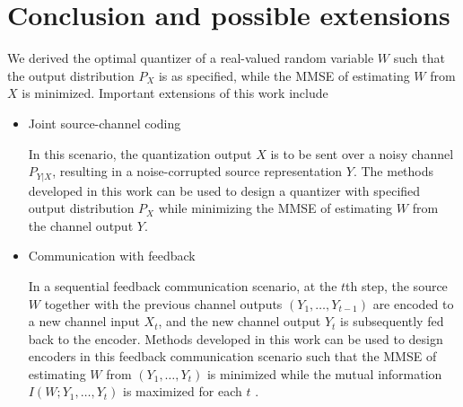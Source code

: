 \documentclass[conference]{IEEEtran}
\newcommand{\E}{\mathbb{E}}
\begin{document}
\section{Conclusion and possible extensions}
We derived the optimal quantizer of a real-valued random variable $W$ such that the output distribution $P_X$ is as specified, while the MMSE of estimating $W$ from $X$ is minimized.
Important extensions of this work include 
\begin{itemize}[leftmargin=*]
\item Joint source-channel coding

In this scenario, the quantization output $X$ is to be sent over a noisy channel $P_{Y|X}$, resulting in a noise-corrupted source representation $Y$. 
The methods developed in this work can be used to design a quantizer with specified output distribution $P_X$ while minimizing the MMSE of estimating $W$ from the channel output $Y$.
    
\item Communication with feedback 

In a sequential feedback communication scenario, at the $t$th step, the source $W$ together with the previous channel outputs $(Y_1, \ldots, Y_{t-1})$ are encoded to a new channel input $X_t$, and the new channel output $Y_t$ is subsequently fed back to the encoder. Methods developed in this work can be used to design encoders in this feedback communication scenario such that the MMSE of estimating $W$ from $(Y_1, \ldots, Y_t)$ is minimized while the mutual information $I(W; Y_1, \ldots, Y_t)$ is maximized for each $t$ \cite{feedback_maxI_minD_xu}.
\end{itemize}




{
    \small
    
}
\end{document}
